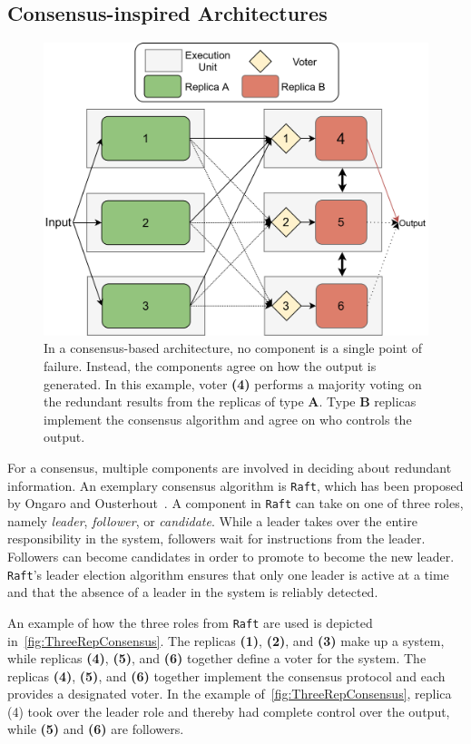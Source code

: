 \subsection{Consensus-inspired Architectures}
\label{subsec:consensusArchitecture}
\begin{figure}[!hb]
	\centering
	\includegraphics[width=0.8\linewidth]{images/ThreeComponentConsensus}
	\caption{In a consensus-based architecture, no component is a single point of failure. Instead, the components agree on how the output is generated. In this example, voter \textbf{(4)} performs a majority voting on the redundant results from the replicas of type \textbf{A}. Type \textbf{B} replicas implement the consensus algorithm and agree on who controls the output.}
	\label{fig:ThreeRepConsensus}
\end{figure}

For a consensus, multiple components are involved in deciding about redundant information.
An exemplary consensus algorithm is \texttt{Raft}, which has been proposed by Ongaro and Ousterhout~\cite{RaftConsensusPaper}.
A component in \texttt{Raft} can take on one of three roles, namely \textit{leader}, \textit{follower}, or \textit{candidate}.
While a leader takes over the entire responsibility in the system, followers wait for instructions from the leader.
Followers can become candidates in order to promote to become the new leader.
\texttt{Raft}'s leader election algorithm ensures that only one leader is active at a time and that the absence of a leader in the system is reliably detected.

An example of how the three roles from \texttt{Raft} are used is depicted in~\autoref{fig:ThreeRepConsensus}.
The replicas \textbf{(1)}, \textbf{(2)}, and \textbf{(3)} make up a  system, while replicas \textbf{(4)}, \textbf{(5)}, and \textbf{(6)} together define a voter for the system.
The replicas \textbf{(4)}, \textbf{(5)}, and \textbf{(6)} together implement the consensus protocol and each provides a designated voter.
In the example of~\autoref{fig:ThreeRepConsensus}, replica (4) took over the leader role and thereby had complete control over the output, while \textbf{(5)} and \textbf{(6)} are followers.
\\

